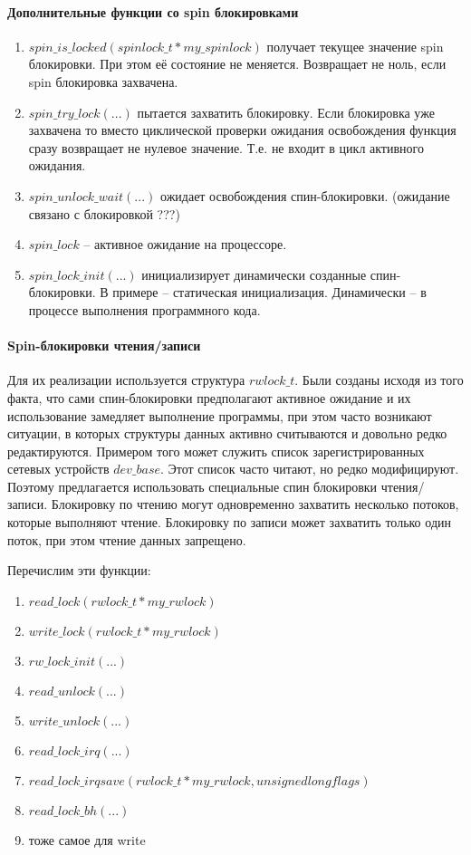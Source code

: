  

\paragraph{Дополнительные функции со spin блокировками}
\begin{enumerate}
	\item $spin\_is\_locked(spinlock\_t *my\_spinlock)$ получает текущее значение spin блокировки. При этом её состояние не меняется. Возвращает не ноль, если spin блокировка захвачена. 
	\item $spin\_try\_lock(...)$ пытается захватить блокировку. Если блокировка уже захвачена то вместо циклической проверки ожидания освобождения функция сразу возвращает не нулевое значение. Т.е. не входит в цикл активного ожидания.
	\item $spin\_unlock\_wait(...)$  ожидает освобождения спин-блокировки. (ожидание связано с блокировкой ???)
	\item $spin\_lock$ – активное ожидание на процессоре.
	\item $spin\_lock\_init(...)$ инициализирует динамически созданные спин-блокировки. В примере – статическая инициализация. Динамически – в процессе выполнения программного кода. 
\end{enumerate} 

\paragraph{Spin-блокировки чтения/записи}

Для их реализации используется структура $rwlock\_t$. Были созданы исходя из того факта, что сами спин-блокировки предполагают активное ожидание и их использование замедляет выполнение программы, при этом часто возникают ситуации, в которых структуры данных активно считываются и довольно редко редактируются.  Примером того может служить список зарегистрированных сетевых устройств $dev\_base$. Этот список часто читают, но редко модифицируют. Поэтому предлагается использовать специальные спин блокировки чтения/записи. Блокировку по чтению могут одновременно захватить несколько потоков, которые выполняют чтение. Блокировку по записи может захватить только один поток, при этом чтение данных запрещено. 

Перечислим эти функции:
\begin{enumerate}
	\item $read\_lock(rwlock\_t *my\_rwlock)$
	\item $write\_lock(rwlock\_t *my\_rwlock)$
	\item $rw\_lock\_init(...)$
	\item $read\_unlock(...)$
	\item $write\_unlock(...)$
	\item $read\_lock\_irq(...)$
	\item $read\_lock\_irqsave(rwlock\_t *my\_rwlock, unsigned long flags)$
	\item $read\_lock\_bh(...)$
	\item тоже самое для write
\end{enumerate}

